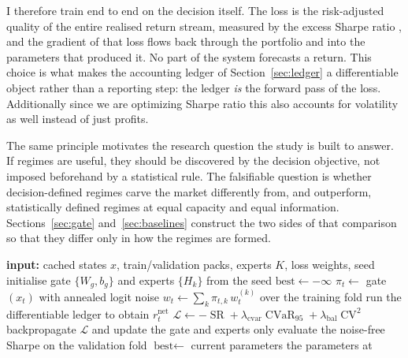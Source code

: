 I therefore train end to end on the decision itself. The loss is the risk-adjusted quality of the entire realised return stream, measured by the excess Sharpe ratio \cite{sharpe1994sharpe}, and the gradient of that loss flows back through the portfolio and into the parameters that produced it. No part of the system forecasts a return. This choice is what makes the accounting ledger of Section~\ref{sec:ledger} a differentiable object rather than a reporting step: the ledger \emph{is} the forward pass of the loss. Additionally since we are optimizing Sharpe ratio this also accounts for volatility as well instead of just profits.

The same principle motivates the research question the study is built to answer. If regimes are useful, they should be discovered by the decision objective, not imposed beforehand by a statistical rule. The falsifiable question is whether decision-defined regimes carve the market differently from, and outperform, statistically defined regimes at equal capacity and equal information. Sections~\ref{sec:gate} and~\ref{sec:baselines} construct the two sides of that comparison so that they differ only in how the regimes are formed.

\begin{algorithm}[t]
  \caption{Decision-focused training of one mixture on one fold}
  \label{alg:train}
  \begin{algorithmic}[1]
    \STATE \textbf{input:} cached states $x$, train/validation packs, experts $K$, loss weights, seed
    \STATE initialise gate $\{W_g,b_g\}$ and experts $\{H_k\}$ from the seed
    \STATE $\text{best} \gets -\infty$
      \STATE $\pi_t \gets$ gate$(x_t)$ with annealed logit noise 
      \STATE $w_t \gets \sum_k \pi_{t,k}\, w_t^{(k)}$ over the training fold 
      \STATE run the differentiable ledger to obtain $r^{\text{net}}_{t}$
      \STATE $\mathcal{L} \gets -\operatorname{SR} + \lambda_{\text{cvar}}\operatorname{CVaR}_{95} + \lambda_{\text{bal}}\operatorname{CV}^2$ 
      \STATE backpropagate $\mathcal{L}$ and update the gate and experts only
      \STATE evaluate the noise-free Sharpe on the validation fold
        \STATE $\text{best} \gets$ current parameters
      \ENDIF
    \ENDFOR
    \RETURN the parameters at 
  \end{algorithmic}
\end{algorithm}


